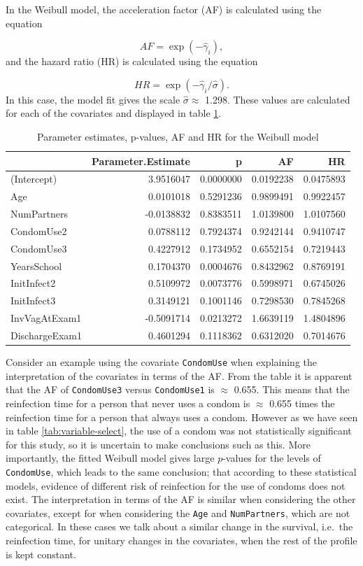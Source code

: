 \documentclass[
]{article}
\begin{document}
In the Weibull model, the acceleration factor (AF) is calculated using the equation

\[
AF = \exp(-\hat{\gamma}_i),
\]
and the hazard ratio (HR) is calculated using the equation

\[
HR = \exp(-\hat{\gamma}_i/\hat{\sigma}).
\]
In this case, the model fit gives the scale \(\hat{\sigma} \approx\) 1.298. These values are calculated for each of the covariates and displayed in table \ref{tab:Weibull-table}.

\begin{table}

\caption{\label{tab:Weibull-table}Parameter estimates, p-values, AF and HR for the Weibull model}
\centering
\begin{tabular}[t]{l|r|r|r|r}
\hline
  & Parameter.Estimate & p & AF & HR\\
\hline
(Intercept) & 3.9516047 & 0.0000000 & 0.0192238 & 0.0475893\\
\hline
Age & 0.0101018 & 0.5291236 & 0.9899491 & 0.9922457\\
\hline
NumPartners & -0.0138832 & 0.8383511 & 1.0139800 & 1.0107560\\
\hline
CondomUse2 & 0.0788112 & 0.7924374 & 0.9242144 & 0.9410747\\
\hline
CondomUse3 & 0.4227912 & 0.1734952 & 0.6552154 & 0.7219443\\
\hline
YearsSchool & 0.1704370 & 0.0004676 & 0.8432962 & 0.8769191\\
\hline
InitInfect2 & 0.5109972 & 0.0073776 & 0.5998971 & 0.6745026\\
\hline
InitInfect3 & 0.3149121 & 0.1001146 & 0.7298530 & 0.7845268\\
\hline
InvVagAtExam1 & -0.5091714 & 0.0213272 & 1.6639119 & 1.4804896\\
\hline
DischargeExam1 & 0.4601294 & 0.1118362 & 0.6312020 & 0.7014676\\
\hline
\end{tabular}
\end{table}

Consider an example using the covariate \texttt{CondomUse} when explaining the interpretation of the covariates in terms of the AF. From the table it is apparent that the AF of \texttt{CondomUse3} versus \texttt{CondomUse1} is \(\approx\) 0.655. This means that the reinfection time for a person that never uses a condom is \(\approx\) 0.655 times the reinfection time for a person that always uses a condom. However as we have seen in table \ref{tab:variable-select}, the use of a condom was not statistically significant for this study, so it is uncertain to make conclusions such as this. More importantly, the fitted Weibull model gives large \(p\)-values for the levels of \texttt{CondomUse}, which leads to the same conclusion; that according to these statistical models, evidence of different risk of reinfection for the use of condoms does not exist. The interpretation in terms of the AF is similar when considering the other covariates, except for when considering the \texttt{Age} and \texttt{NumPartners}, which are not categorical. In these cases we talk about a similar change in the survival, i.e.~the reinfection time, for unitary changes in the covariates, when the rest of the profile is kept constant.
\end{document}
